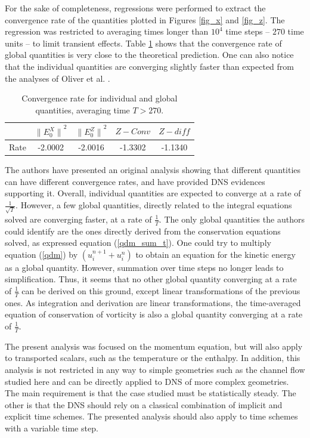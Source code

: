 \documentclass[aip,pof,reprint]{revtex4-1}
\begin{document}
{\color{red}
For the sake of completeness, regressions were performed to extract the convergence rate of the quantities plotted in Figures \ref{fig_x} and \ref{fig_z}.
The regression was restricted to averaging times longer than $10^4$ time steps -- $270$ time units -- to limit transient effects.
Table \ref{tab_conv_rate} shows that the convergence rate of global quantities is very close to the theoretical prediction.
One can also notice that the individual quantities are converging slightly faster than expected from the analyses of Oliver et al. \citep{oliver}.
}

\begin{table}
\caption{\label{tab_conv_rate}Convergence rate for individual and global quantities, averaging time $T>270$.}
\begin{ruledtabular}
\begin{tabular}{rcccc}
 & ${\parallel{E_0^X}\parallel}^2$ & ${\parallel{E_0^Z}\parallel}^2$ & $Z-Conv$ & $Z-diff$ \\
\hline
Rate & -2.0002 & -2.0016 & -1.3302 & -1.1340 \\
\end{tabular}
\end{ruledtabular}
\end{table}

The authors have presented an original analysis showing that different quantities can have different convergence rates, and have provided DNS evidences supporting it.
Overall, individual quantities are expected to converge at a rate of $\frac{1}{\sqrt{T}}$.
However, a few global quantities, directly related to the integral equations solved are converging faster, at a rate of $\frac{1}{T}$.
{\color{red} The only global quantities the authors could identify are the ones directly derived from the conservation equations solved, as expressed equation (\ref{qdm_sum_t}).
One could try to multiply equation (\ref{qdm}) by $\left( u_i^{n+1}+u_i^n \right)$ to obtain an equation for the kinetic energy as a global quantity.
However, summation over time steps no longer leads to simplification.
Thus, it seems that no other global quantity converging at a rate of $\frac{1}{T}$ can be derived on this ground, except linear transformations of the previous ones.
As integration and derivation are linear transformations, the time-averaged equation of conservation of vorticity is also a global quantity converging at a rate of $\frac{1}{T}$.}

The present analysis was focused on the momentum equation, but will also apply to transported scalars, such as the temperature or the enthalpy.
In addition, this analysis is not restricted in any way to simple geometries such as the channel flow studied here and can be directly applied to DNS of more complex geometries.
The main requirement is that the case studied must be statistically steady.
The other is that the DNS should rely on a classical combination of implicit and explicit time schemes.
The presented analysis should also apply to time schemes with a variable time step.
\end{document}
